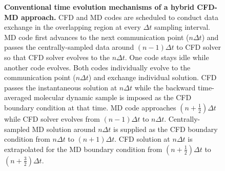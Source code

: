 \documentclass[preprint,12pt]{elsarticle}
\begin{document}
\begin{figure}
\centering
{}
\hskip 1cm
\hskip 1cm
\caption[]{\small {\bf Conventional time evolution mechanisms of a hybrid CFD-MD approach.} 
CFD and MD codes are scheduled to conduct data exchange in the overlapping 
region at every $\Delta{t}$ sampling interval.
 MD code first advances to the next communication
point ($n{\Delta}t$) and passes the centrally-sampled data around
$(n-1){\Delta}t$ to CFD solver so that CFD solver evolves to the $n{\Delta}t$.
One code stays idle while another code evolves.
 Both codes individually evolve to the communication
point ($n{\Delta}t$) and exchange individual solution.
CFD passes the instantaneous solution at $n{\Delta}t$ while
the backward time-averaged molecular dynamic sample is imposed as the
CFD boundary condition at that time.
 MD code approaches $(n+\frac{1}{2}){\Delta}t$ while
CFD solver evolves from $(n-1){\Delta}t$ to $n{\Delta}t$. Centrally-sampled MD solution
around $n{\Delta}t$ is supplied as the CFD boundary condition
from $n{\Delta}t$ to $(n+1){\Delta}t$. CFD solution at $n{\Delta}t$ is extrapolated
for the MD boundary condition from $(n+\frac{1}{2}){\Delta}t$ to $(n+\frac{3}{2}){\Delta}t$.}
\label{Hybrid_Timescale1}
\end{figure}
\end{document}
